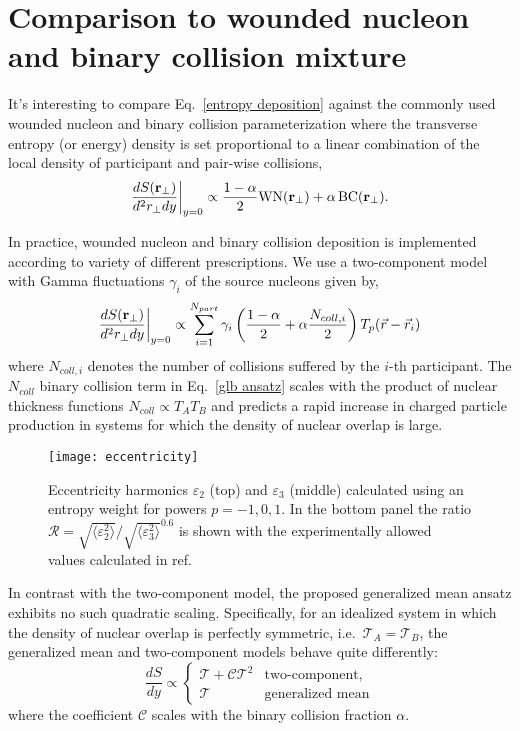 \documentclass[aps,prl,reprint,amsmath,nofootinbib]{revtex4-1}
\begin{document}
\section{Comparison to wounded nucleon and binary collision mixture}

It's interesting to compare Eq.~\eqref{entropy deposition} against the commonly used wounded nucleon and
binary collision parameterization where the transverse entropy (or energy) density is set proportional to a
linear combination of the local density of participant and pair-wise collisions,
\begin{equation}
  \label{glb ansatz}
  \frac{dS({\bf r}_\perp)}{d^2r_\perp dy} \biggr \rvert_{y=0} \propto
  \frac{1-\alpha}{2}\mbox{WN}({\bf r_\perp}) + \alpha\, \mbox{BC}({\bf r_\perp}).
\end{equation}

In practice, wounded nucleon and binary collision deposition is implemented according to variety of different
prescriptions. We use a two-component model with Gamma fluctuations $\gamma_i$ of the source nucleons given
by,
\begin{equation}
  \label{glb algorithm}
  \frac{dS({\bf r}_\perp)}{d^2r_\perp dy} \biggr \rvert_{y=0} \propto
  \sum\limits_{i=1}^{N_{part}} \gamma_i \left(\frac{1-\alpha}{2} +
  \alpha \frac{N_{coll,i}}{2} \right ) T_p(\vec{r}-\vec{r}_i)
\end{equation}
where $N_{coll,i}$ denotes the number of collisions suffered by the $i$-th participant. The $N_{coll}$ binary
collision term in Eq.~\eqref{glb ansatz} scales with the product of nuclear thickness functions $N_{coll}
\propto T_A T_B$ and predicts a rapid increase in charged particle production in systems for which the density
of nuclear overlap is large.

\begin{figure}[t]
  \texttt{[image: eccentricity]}
  \caption{\label{fig:eccen}Eccentricity harmonics $\varepsilon_2$ (top) and $\varepsilon_3$ (middle)
  calculated using an entropy weight for powers $p=-1,0,1$.  In the bottom panel the ratio $\mathcal{R} =
  \sqrt{\langle \varepsilon_2^2 \rangle}/\sqrt{\langle \varepsilon_3^2 \rangle}^{0.6}$ is shown with the
  experimentally allowed values calculated in ref.\ \cite{constraining-ic}}
\end{figure}

In contrast with the two-component model, the proposed generalized mean ansatz exhibits no such quadratic
scaling. Specifically, for an idealized system in which the density of nuclear overlap is perfectly symmetric,
i.e.\ $\mathcal{T}_A = \mathcal{T}_B$, the generalized mean and two-component models behave quite differently:
\begin{equation}
  \label{symmetric scaling}
  \frac{dS}{dy} \propto
  \begin{cases}
    \mathcal{T} + \mathcal{C} \mathcal{T}^2 & \text{two-component,} \\
    \mathcal{T} & \text{generalized mean}
  \end{cases}
\end{equation}
where the coefficient $\mathcal{C}$ scales with the binary collision fraction $\alpha$.
\end{document}
